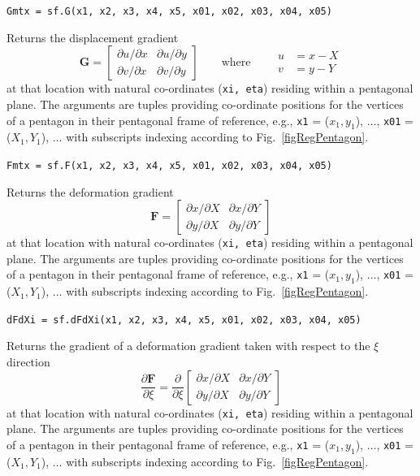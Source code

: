 \medskip\noindent
\texttt{Gmtx = sf.G(x1, x2, x3, x4, x5, x01, x02, x03, x04, x05)}

\medskip\noindent
Returns the displacement gradient 
\begin{displaymath}
   \mathbf{G} = \begin{bmatrix}
        \partial u / \partial x & \partial u / \partial y \\
        \partial v / \partial x & \partial v / \partial y 
   \end{bmatrix}
   \qquad \text{where} \qquad
   \begin{aligned}
        u & = x - X \\
        v & = y - Y
   \end{aligned}
\end{displaymath}
at that location with natural co-ordinates (\texttt{xi, eta}) residing within a pentagonal plane.  The arguments are tuples providing co-ordinate positions for the vertices of a pentagon in their pentagonal frame of reference, e.g., \texttt{x1} = ($x_1, y_1$), $\ldots$, \texttt{x01} = ($X_1, Y_1$), $\ldots$ with subscripts indexing according to Fig.~\ref{figRegPentagon}.

\medskip\noindent
\texttt{Fmtx = sf.F(x1, x2, x3, x4, x5, x01, x02, x03, x04, x05)}

\medskip\noindent
Returns the deformation gradient 
\begin{displaymath}
\mathbf{F} = \begin{bmatrix}
\partial x / \partial X & \partial x / \partial Y \\
\partial y / \partial X & \partial y / \partial Y 
\end{bmatrix}
\end{displaymath}
at that location with natural co-ordinates (\texttt{xi, eta}) residing within a pentagonal plane.  The arguments are tuples providing co-ordinate positions for the vertices of a pentagon in their pentagonal frame of reference, e.g., \texttt{x1} = ($x_1, y_1$), $\ldots$, \texttt{x01} = ($X_1, Y_1$), $\ldots$ with subscripts indexing according to Fig.~\ref{figRegPentagon}.

\medskip\noindent
\texttt{dFdXi = sf.dFdXi(x1, x2, x3, x4, x5, x01, x02, x03, x04, x05)}

\medskip\noindent
Returns the gradient of a deformation gradient taken with respect to the $\xi$ direction 
\begin{displaymath}
\frac{\partial\mathbf{F}}{\partial \xi} = \frac{\partial}{\partial \xi} 
\begin{bmatrix}
\partial x / \partial X & \partial x / \partial Y \\
\partial y / \partial X & \partial y / \partial Y 
\end{bmatrix}
\end{displaymath}
at that location with natural co-ordinates (\texttt{xi, eta}) residing within a pentagonal plane.  The arguments are tuples providing co-ordinate positions for the vertices of a pentagon in their pentagonal frame of reference, e.g., \texttt{x1} = ($x_1, y_1$), $\ldots$, \texttt{x01} = ($X_1, Y_1$), $\ldots$ with subscripts indexing according to Fig.~\ref{figRegPentagon}.

